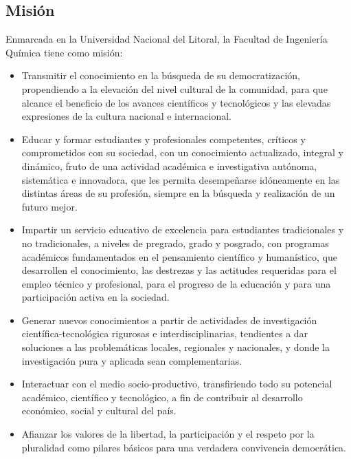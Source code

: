 \documentclass[10pt,a4paper,final]{article}
\begin{document}
\subsection{Misión}
Enmarcada en la Universidad Nacional del Litoral, la Facultad de Ingeniería Química tiene como misión:
\begin{itemize}
\item Transmitir el conocimiento en la búsqueda de su democratización, propendiendo a la elevación del nivel cultural de la comunidad, para que alcance el beneficio de los avances científicos y tecnológicos y las elevadas expresiones de la cultura nacional e internacional.
\item Educar y formar estudiantes y profesionales competentes, críticos y comprometidos con su sociedad, con un conocimiento actualizado, integral y dinámico, fruto de una actividad académica e investigativa autónoma, sistemática e innovadora, que les permita desempeñarse idóneamente en las distintas áreas de su profesión, siempre en la búsqueda y realización de un futuro mejor.
\item Impartir un servicio educativo de excelencia para estudiantes tradicionales y no tradicionales, a niveles de pregrado, grado y posgrado, con programas académicos fundamentados en el pensamiento científico y humanístico, que desarrollen el conocimiento, las destrezas y las actitudes requeridas para el empleo técnico y profesional, para el progreso de la educación y para una participación activa en la sociedad.
\item Generar nuevos conocimientos a partir de actividades de investigación científica-tecnológica rigurosas e interdisciplinarias, tendientes a dar soluciones a las problemáticas locales, regionales y nacionales, y donde la investigación pura y aplicada sean complementarias.
\item Interactuar con el medio socio-productivo, transfiriendo todo su potencial académico, científico y tecnológico, a fin de contribuir al desarrollo económico, social y cultural del país.
\item Afianzar los valores de la libertad, la participación y el respeto por la pluralidad como pilares básicos para una verdadera convivencia democrática.
\end{itemize}
\end{document}
